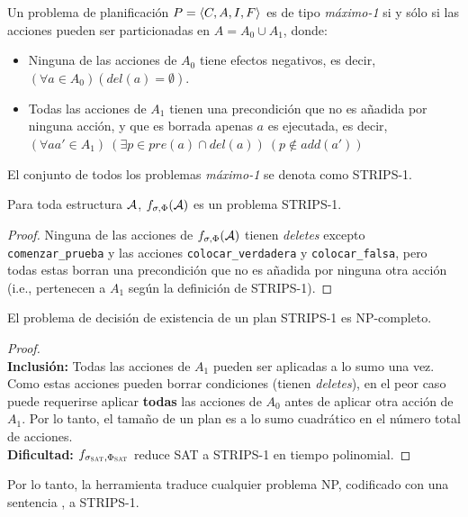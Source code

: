\begin{definition}
Un problema de planificación $P = \langle C, A, I, F \rangle$ es de tipo
\textit{máximo-1} si y sólo si las acciones pueden ser particionadas en $A =
A_0 \cup A_1$, donde:
\begin{itemize}
\item Ninguna de las acciones de $A_0$ tiene efectos negativos, es decir,
$(\forall a \in A_0) (del(a) = \emptyset)$.
\item Todas las acciones de $A_1$ tienen una precondición que no es añadida por
ninguna acción, y que es borrada apenas $a$ es ejecutada, es decir, 
$(\forall aa' \in A_1)\ (\exists p \in pre(a) \cap del(a))\ (p \not\in add(a'))$
\end{itemize}

El conjunto de todos los problemas \textit{máximo-1} se denota como STRIPS-1.
\end{definition}

\begin{theorem}
Para toda estructura $\mathcal{A}$, $f_{\sigma, \Phi}(\mathcal{A})$ es un problema STRIPS-1.
\end{theorem}
\begin{proof}
Ninguna de las acciones de $f_{\sigma, \Phi}(\mathcal{A})$ tienen \textit{deletes} excepto
\texttt{comenzar\_prueba} y las acciones \texttt{colocar\_verdadera} y
\texttt{colocar\_falsa}, pero todas estas borran una precondición que no es
añadida por ninguna otra acción (i.e., pertenecen a $A_1$ según la definición
de STRIPS-1).
\end{proof}

\begin{theorem}
El problema de decisión de existencia de un plan STRIPS-1 es NP-completo.
\end{theorem}
\begin{proof}
\ \\ \textbf{Inclusión:} Todas las acciones de $A_1$ pueden ser aplicadas a lo
sumo una vez. Como estas acciones pueden borrar condiciones (tienen
\textit{deletes}), en el peor caso puede requerirse aplicar \textbf{todas} las
acciones de $A_0$ antes de aplicar otra acción de $A_1$. Por lo tanto, el
tamaño de un plan es a lo sumo cuadrático en el número total de acciones.
\\ \textbf{Dificultad:} $f_{\sigma_{\textsc{SAT}}, \Phi_{\textsc{SAT}}}$ reduce SAT a STRIPS-1 en
tiempo polinomial.
\end{proof}

Por lo tanto, la herramienta traduce cualquier problema NP, codificado con una
sentencia \SOE, a STRIPS-1.

